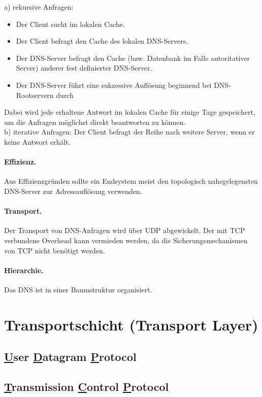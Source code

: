 \documentclass[]{scrartcl}
\begin{document}
a) rekursive Anfragen: 
\begin{itemize} 
\item Der Client sucht im lokalen Cache.
\item Der Client befragt den Cache des lokalen DNS-Servers.
\item Der DNS-Server befragt den Cache (bzw. Datenbank im Falle autoritativer Server) anderer fest definierter DNS-Server.
\item Der DNS-Server f\"uhrt eine sukzessive Aufl\"osung beginnend bei DNS-Rootservern durch
\end{itemize}
Dabei wird jede erhaltene Antwort im lokalen Cache f\"ur einige Tage gespeichert, um die Anfragen m\"oglichst direkt beantworten zu k\"onnen. \\

b) iterative Anfragen: Der Client befragt der Reihe nach weitere Server, wenn er keine Antwort erh\"alt.

\paragraph{Effizienz.} Aus Effizienzgr\"unden sollte ein Endsystem meist den topologisch nahegelegensten DNS-Server zur Adressaufl\"osung verwenden.

\paragraph{Transport.} Der Transport von DNS-Anfragen wird \"uber UDP abgewickelt. Der mit TCP verbundene Overhead kann vermieden werden, da die Sicherungsmechanismen von TCP nicht ben\"otigt werden.

\paragraph{Hierarchie.} Das DNS ist in einer Baumstruktur organisiert.


\section{Transportschicht (Transport Layer)}


\subsection{\underline{U}ser \underline{D}atagram \underline{P}rotocol}

\subsection{\underline{T}ransmission \underline{C}ontrol \underline{P}rotocol}
\end{document}
